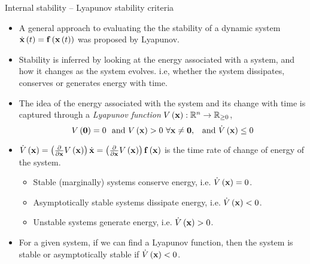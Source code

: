 \documentclass[aspectratio=169]{beamer}
\def\mf{\ensuremath\mathbf}
\def\mb{\ensuremath\mathbb}
\def\lp{\ensuremath\left(}
\def\rp{\ensuremath\right)}
\newcommand{\ct}[1]{\lp #1\rp}
\begin{document}
\begin{frame}{Internal stability -- Lyapunov stability criteria}
\begin{itemize}
    \item A general approach to evaluating the the stability of a dynamic system $\dot{\mf{x}}\ct{t} = \mf{f}\ct{\mf{x}\ct{t}}$ was proposed by Lyapunov. 

    \item Stability is inferred by looking at the energy associated with a system, and how it changes as the system evolves. i.e, whether the system dissipates, conserves or generates energy with time.

    \item The idea of the energy associated with the system and its change with time is captured through a \textit{Lyapunov function} $V\ct{\mf{x}}: \mb{R}^n \to \mb{R}_{\geq 0}$,
    \[ V\ct{\mf{0}} = 0 \,\, \text{ and } V\ct{\mf{x}} > 0 \,\, \forall \mf{x} \neq \mf{0}, \,\,\, \text{ and } \dot{V}\ct{\mf{x}} \leq 0 \]

    \item $\dot{V}\ct{\mf{x}} = \ct{\frac{\partial}{\partial\mf{x}}V\ct{\mf{x}}}\dot{\mf{x}} = \ct{\frac{\partial}{\partial\mf{x}}V\ct{\mf{x}}}\mf{f}\ct{\mf{x}}$ is the time rate of change of energy of the system. 

    \begin{itemize}
        \item Stable (marginally) systems conserve energy, i.e. $\dot{V}\ct{\mf{x}} = 0$.
        \item Asymptotically stable systems dissipate energy, i.e. $\dot{V}\ct{\mf{x}} < 0$.
        \item Unstable systems generate energy, i.e. $\dot{V}\ct{\mf{x}} > 0$.
    \end{itemize}

    \item For a given system, if we can find a Lyapunov function, then the system is stable or asymptotically stable if $\dot{V}\ct{\mf{x}} < 0$.

\end{itemize}
\end{frame}
\end{document}
